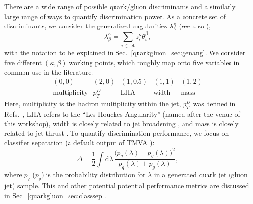 \documentclass[11pt]{cernrep}
\begin{document}
There are a wide range of possible quark/gluon discriminants and a similarly large range of ways to quantify discrimination power.  As a concrete set of discriminants, we consider the generalized angularities $\lambda_\beta^\kappa$ \cite{Larkoski:2014pca} (see also \cite{Berger:2003iw,Almeida:2008yp,Ellis:2010rwa,Larkoski:2014uqa}),
\begin{equation}
\label{quarkgluon_eq:genang_intro}
\lambda^{\kappa}_{\beta} = \sum_{i \in \text{jet}} z_i^\kappa \theta_i^\beta,
\end{equation}
with the notation to be explained in Sec.~\ref{quarkgluon_sec:genang}.  We consider five different $(\kappa, \beta)$ working points, which roughly map onto five variables in common use in the literature:
\begin{equation}
\begin{array}{ccccc}
(0,0) & (2,0) & (1,0.5) & (1,1) & (1,2) \\
\text{multiplicity} &  p_T^D &  \text{LHA} & \text{width} & \text{mass}
\end{array}
\end{equation}
Here, multiplicity is the hadron multiplicity within the
jet, $p_T^D$ was defined in
Refs.~\cite{Pandolfi:1480598,Chatrchyan:2012sn}, LHA refers to the
``Les Houches Angularity'' (named after the venue of this workshop),
width is closely related to jet broadening
\cite{Catani:1992jc,Rakow:1981qn,Ellis:1986ig}, and mass is closely
related to jet thrust \cite{Farhi:1977sg}.  To quantify discrimination
performance, we focus on classifier separation (a default output of
TMVA \cite{2007physics...3039H}):
\begin{equation}
\label{quarkgluon_eq:deltadef_intro}
\Delta =  \frac{1}{2} \int \text{d} \lambda \, \frac{\bigl(p_q(\lambda) - p_g(\lambda)\bigr)^2}{p_q(\lambda) + p_g(\lambda)},
\end{equation}
where $p_q$ ($p_g$) is the probability distribution for $\lambda$ in a generated quark jet (gluon jet) sample.  This and other potential potential performance metrics are discussed in
Sec.~\ref{quarkgluon_sec:classsep}.
\end{document}
